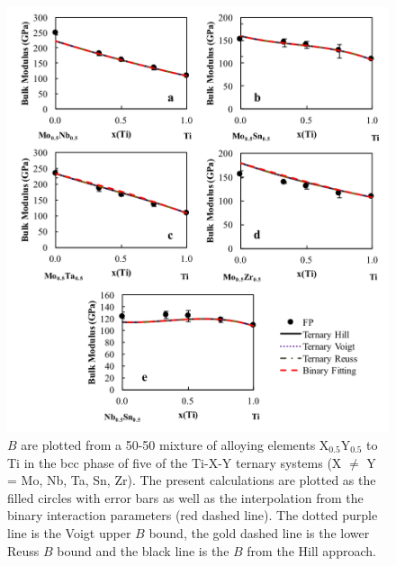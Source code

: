 \pagebreak
\begin{figure}[H]
	\centering
	\includegraphics[width=\textwidth]{Chapter-6/Figures/tixybulk1.png}
	\caption{$B$ are plotted from a 50-50 mixture of alloying elements X$_{0.5}$Y$_{0.5}$ to Ti in the bcc phase of five of the Ti-X-Y ternary systems (X $\neq$ Y = Mo, Nb, Ta, Sn, Zr). The present calculations are plotted as the filled circles with error bars as well as the interpolation from the binary interaction parameters (red dashed line). The dotted purple line is the Voigt upper $B$ bound, the gold dashed line is the lower Reuss $B$ bound and the black line is the $B$ from the Hill approach.}
	\label{Ch6-figure:tixybulk1}
\end{figure}

